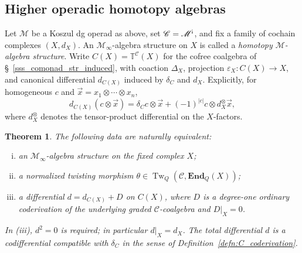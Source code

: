 \documentclass[11pt,letterpaper]{article}
\numberwithin{equation}{section}
\theoremstyle{plain}
\newtheorem{thm}{Theorem}[section]
\theoremstyle{definition}
\theoremstyle{remark}
\newcommand{\antishriek}{%
	\mathord{\mathchoice
		{\rotatebox[origin=c]{180}{$\displaystyle !$}}
		{\rotatebox[origin=c]{180}{$\textstyle !$}}
		{\rotatebox[origin=c]{180}{$\scriptstyle !$}}
		{\rotatebox[origin=c]{180}{$\scriptscriptstyle !$}}}}
\begin{document}
\subsection{Higher operadic homotopy algebras}
Let $\mathscr M$ be a Koszul dg operad as above, set $\mathscr C=\mathscr M^{\antishriek}$, and fix a family of cochain complexes $(X,d_X)$. An $\mathscr M_\infty$-algebra structure on $X$ is called a \textit{homotopy $\mathscr M$-algebra structure}. Write
$C(X)=\mathbb T^{\mathscr C}(X)$ for the cofree coalgebra of \S~\ref{sss_comonad_str_induced}, with coaction $\Delta_X$, projection $\varepsilon_X:C(X)\to X$, and canonical differential $d_{C(X)}$ induced by $\delta_C$ and $d_X$. Explicitly, for homogeneous $c$ and $\vec x=x_1\otimes\cdots\otimes x_n$,
\[
 d_{C(X)}(c\otimes\vec x)
 =\delta_Cc\otimes\vec x+(-1)^{|c|}c\otimes d_X^{\otimes}\vec x,
\]
where $d_X^{\otimes}$ denotes the tensor-product differential on the $X$-factors.
\begin{thm}\label{thm_three_homotopy_M_algebra_definitions}
The following data are naturally equivalent:
\begin{enumerate}[(i)]
\item an $\mathscr M_\infty$-algebra structure on the fixed complex $X$;
\item a normalized twisting morphism $\theta\in\operatorname{Tw}_Q(\mathscr C,\mathbf{End}_Q(X))$;
\item a differential $d=d_{C(X)}+D$ on $C(X)$, where $D$ is a degree-one ordinary coderivation of the underlying graded $\mathscr C$-coalgebra and $D|_X=0$.
\end{enumerate}
In (iii), $d^2=0$ is required; in particular $d|_X=d_X$. The total differential $d$ is a codifferential compatible with $\delta_C$ in the sense of Definition~\ref{defn:C_coderivation}.
\end{thm}
\end{document}
